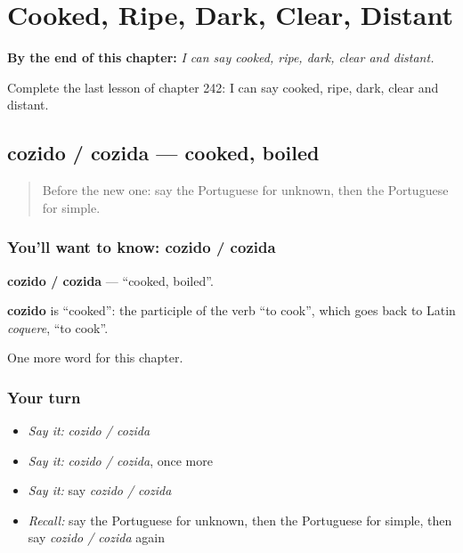 
\chapter{Cooked, Ripe, Dark, Clear, Distant}
\label{ch:pt-cooked-ripe-dark-clear-distant}

\begin{chapteropening}
\textbf{By the end of this chapter:} \emph{I can say cooked, ripe, dark, clear and distant.}

Complete the last lesson of chapter 242: I can say cooked, ripe, dark, clear and distant.
\end{chapteropening}

\section[cozido / cozida]{cozido / cozida — cooked, boiled}

\label{lesson:PT-C242-cozido-cozida}



\begin{quote}
Before the new one: say the Portuguese for unknown, then the Portuguese for simple.
\end{quote}

\subsection*{You'll want to know: cozido / cozida}
\textbf{cozido / cozida} — \textquotedblleft{}cooked, boiled\textquotedblright{}.

\begin{cousinweb}
\textbf{cozido} is \textquotedblleft{}cooked\textquotedblright{}: the participle of the verb \textquotedblleft{}to cook\textquotedblright{}, which goes back to Latin \emph{coquere}, \textquotedblleft{}to cook\textquotedblright{}.
\end{cousinweb}

\begin{grammarlens}[title={What you've built}]
One more word for this chapter.
\end{grammarlens}

\subsection*{Your turn}
\begin{itemize}
\raggedright
  \item \emph{Say it:} \emph{cozido / cozida}
  \item \emph{Say it:} \emph{cozido / cozida}, once more
  \item \emph{Say it:} say \emph{cozido / cozida}
  \item \emph{Recall:} say the Portuguese for unknown, then the Portuguese for simple, then say \emph{cozido / cozida} again
\end{itemize}

